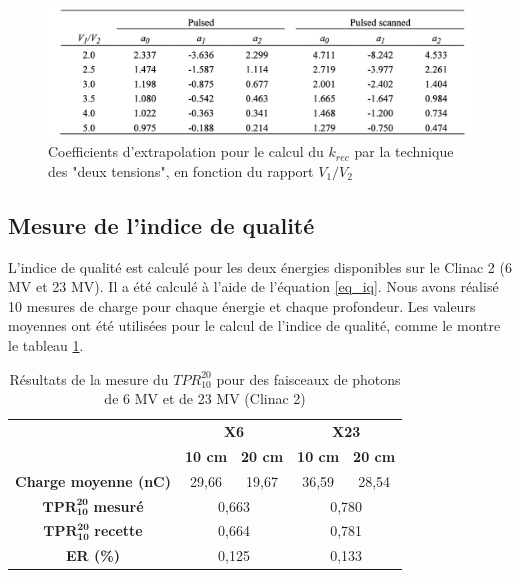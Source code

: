 \documentclass{article}
\begin{document}
\begin{figure}[h!]
  \centering
  \includegraphics[scale=0.5]{figures/coeff_krec.png}
  \caption{Coefficients d'extrapolation pour le calcul du $k_{rec}$ par la technique des "deux tensions", en fonction du rapport $V_1/V_2$}
  \label{fig_krec}
\end{figure}

\newpage
\subsection{Mesure de l'indice de qualité}

L'indice de qualité est calculé pour les deux énergies disponibles sur le Clinac 2 (6 MV et 23 MV). Il a été calculé à l'aide de l'équation \ref*{eq_iq}. Nous avons réalisé 10 mesures de charge pour chaque énergie et chaque profondeur. Les valeurs moyennes ont été utilisées pour le calcul de l'indice de qualité, comme le montre le tableau \ref*{table_resultats_tpr}.

\begin{table}[h]
  \centering
  \begin{tabular}{c|cc|cc|}
  \cline{2-5}
  \textbf{} & \multicolumn{2}{c|}{\textbf{X6}} & \multicolumn{2}{c|}{\textbf{X23}} \\ \cline{2-5} 
  \textbf{} & \textbf{10 cm} & \textbf{20 cm} & \textbf{10 cm} & \textbf{20 cm} \\ \hline
  \multicolumn{1}{|c|}{\textbf{Charge moyenne   (nC)}} & 29,66 & 19,67 & 36,59 & 28,54 \\
  \hline
  \multicolumn{1}{|c|}{$\mathbf{TPR^{20}_{10}}$ \textbf{mesuré}} & \multicolumn{2}{c|}{0,663} & \multicolumn{2}{c|}{0,780} \\
  \multicolumn{1}{|c|}{$\mathbf{TPR^{20}_{10}}$ \textbf{recette}} & \multicolumn{2}{c|}{0,664} & \multicolumn{2}{c|}{0,781} \\
  \multicolumn{1}{|c|}{\textbf{ER (\%)}} & \multicolumn{2}{c|}{0,125} & \multicolumn{2}{c|}{0,133} \\ \hline
  \end{tabular}
  \caption{Résultats de la mesure du $TPR^{20}_{10}$ pour des faisceaux de photons de 6 MV et de 23 MV (Clinac 2)}
  \label{table_resultats_tpr}
\end{table}
\end{document}
